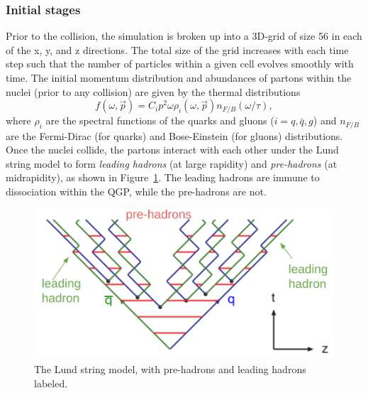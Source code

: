 \subsubsection{Initial stages}
Prior to the collision, the simulation is broken up into a 3D-grid of size 56 in each of the x, y, and z directions. The total size of the grid increases with each time step such that the number of particles within a given cell evolves smoothly with time. The initial momentum distribution and abundances of partons within the nuclei (prior to any collision) are given by the thermal distributions
\begin{equation}
    f(\omega, \vec{p}) = C_i p^2 \omega \rho_i(\omega, \vec{p}) n_{F / B}(\omega / \tau),
\end{equation}
where $\rho_i$ are the spectral functions of the quarks and gluons ($i = q, \bar{q}, g$) and $n_{F / B}$ are the Fermi-Dirac (for quarks) and Bose-Einstein (for gluons) distributions. Once the nuclei collide, the partons interact with each other under the Lund string model to form \textit{leading hadrons} (at large rapidity) and \textit{pre-hadrons} (at midrapidity), as shown in Figure~\ref{fig:lund_string_phsd}. The leading hadrons are immune to dissociation within the QGP, while the pre-hadrons are not. 

\begin{figure}[ht]
    \centering
    \includegraphics[width=0.5\linewidth]{figures/introduction/lund_string_phsd.png}
    \caption{The Lund string model, with pre-hadrons and leading hadrons labeled.}
    \label{fig:lund_string_phsd}
\end{figure}

